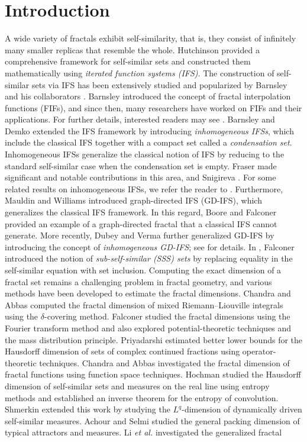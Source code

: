 \documentclass[12pt,oneside,reqno]{amsart}
\theoremstyle{definition}
\theoremstyle{remark}
\begin{document}
\section{Introduction}\label{section 1} 
A wide variety of fractals exhibit self-similarity, that is, they consist of infinitely many smaller replicas that resemble the whole. Hutchinson \cite{Hut} provided a comprehensive framework for self-similar sets and constructed them mathematically using \textit{iterated function systems (IFS)}. The construction of self-similar sets via IFS has been extensively studied and popularized by Barnsley and his collaborators \cite{MF1, MF2, MF3}. Barnsley \cite{MF1} introduced the concept of fractal interpolation functions (FIFs), and since then, many researchers have worked on FIFs and their applications. For further details, interested readers may see \cite{SS5, Celik, KVB1, LCP1, M2, Ri2, Ruan3, Ruan4, Verma21}. Barnsley and Demko \cite{MF3} extended the IFS framework by introducing \textit{inhomogeneous IFSs}, which include the classical IFS together with a compact set called a \textit{condensation set}. Inhomogeneous IFSs generalize the classical notion of IFS by reducing to the standard self-similar case when the condensation set is empty. Fraser \cite{Fraser1} made significant and notable contributions in this area, and Snigireva \cite{Sn}. For some related results on inhomogeneous IFSs, we refer the reader to \cite{B, K, Bu, Frase}. Furthermore, Mauldin and Williams \cite{Rd} introduced graph-directed IFS (GD-IFS), which generalizes the classical IFS framework. In this regard, Boore and Falconer \cite{bFalc} provided an example of a graph-directed fractal that a classical IFS cannot generate. More recently, Dubey and Verma further generalized GD-IFS by introducing the concept of \textit{inhomogeneous GD-IFS}; see \cite{DV1, DV2, Nussbaum1} for details. In \cite{Fal1}, Falconer introduced the notion of \textit{sub-self-similar (SSS) sets} by replacing equality in the self-similar equation with set inclusion. Computing the exact dimension of a fractal set remains a challenging problem in fractal geometry, and various methods have been developed to estimate the fractal dimensions. Chandra and Abbas \cite{Chana} computed the fractal dimension of mixed Riemann--Liouville integrals using the $\delta$-covering method. Falconer \cite{Fal} studied the fractal dimensions using the Fourier transform method and also explored potential-theoretic techniques and the mass distribution principle. Priyadarshi \cite{Pr1} estimated better lower bounds for the Hausdorff dimension of sets of complex continued fractions using operator-theoretic techniques. Chandra and Abbas \cite{SS5} investigated the fractal dimension of fractal functions using function space techniques. Hochman \cite{MHOCHMAN} studied the Hausdorff dimension of self-similar sets and measures on the real line using entropy methods and established an inverse theorem for the entropy of convolution. Shmerkin \cite{Shmerkin} extended this work by studying the $L^q$-dimension of dynamically driven self-similar measures. Achour and Selmi \cite{Ach} studied the general packing dimension of typical attractors and measures. Li \textit{et al.} \cite{Acho} investigated the generalized fractal 
\end{document}

